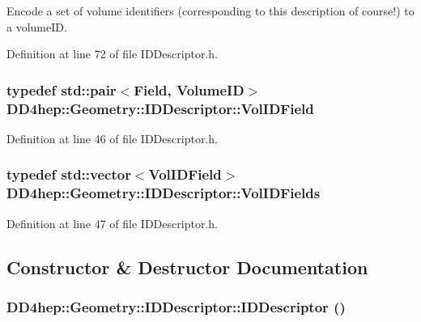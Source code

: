 Encode a set of volume identifiers (corresponding to this description of course!) to a volumeID. 

Definition at line 72 of file IDDescriptor.h.\hypertarget{class_d_d4hep_1_1_geometry_1_1_i_d_descriptor_a29eabc3d9c0c0cfdc01c18e915114a71}{
\subsubsection[{VolIDField}]{\setlength{\rightskip}{0pt plus 5cm}typedef std::pair$<${\bf Field}, VolumeID$>$ {\bf DD4hep::Geometry::IDDescriptor::VolIDField}}}
\label{class_d_d4hep_1_1_geometry_1_1_i_d_descriptor_a29eabc3d9c0c0cfdc01c18e915114a71}


Definition at line 46 of file IDDescriptor.h.\hypertarget{class_d_d4hep_1_1_geometry_1_1_i_d_descriptor_a6c4700a96f3a202eedaa25e54d5695ff}{
\subsubsection[{VolIDFields}]{\setlength{\rightskip}{0pt plus 5cm}typedef std::vector$<${\bf VolIDField}$>$ {\bf DD4hep::Geometry::IDDescriptor::VolIDFields}}}
\label{class_d_d4hep_1_1_geometry_1_1_i_d_descriptor_a6c4700a96f3a202eedaa25e54d5695ff}


Definition at line 47 of file IDDescriptor.h.

\subsection{Constructor \& Destructor Documentation}
\hypertarget{class_d_d4hep_1_1_geometry_1_1_i_d_descriptor_ae8a1de25ea540a8a4b0a51610883cdad}{
\subsubsection[{IDDescriptor}]{\setlength{\rightskip}{0pt plus 5cm}DD4hep::Geometry::IDDescriptor::IDDescriptor ()}}
\label{class_d_d4hep_1_1_geometry_1_1_i_d_descriptor_ae8a1de25ea540a8a4b0a51610883cdad}


